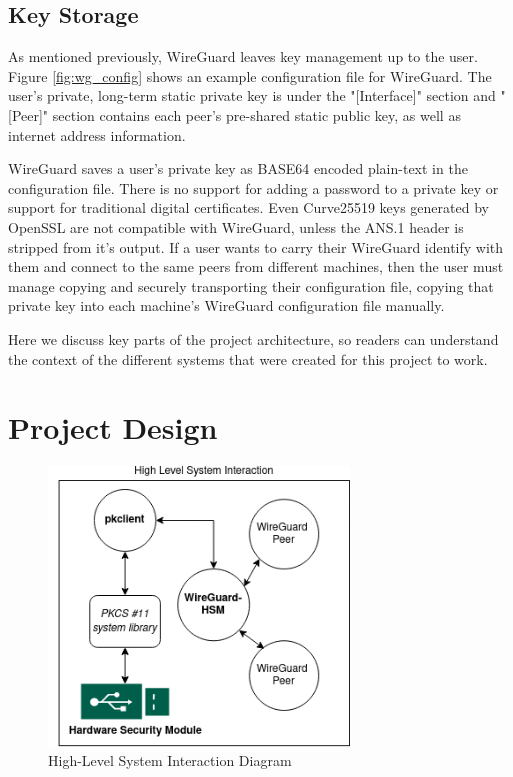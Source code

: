 \documentclass [11pt, proquest] {uwthesis}[2020/02/24]
\begin{document}
\subsection{Key Storage}
As mentioned previously, WireGuard leaves key management up to the user.
Figure \ref{fig:wg_config} shows an example configuration file for WireGuard. The user's private, long-term static private key is under the "[Interface]" section and "[Peer]" section contains each peer's pre-shared static public key, as well as internet address information.

WireGuard saves a user's private key as BASE64 encoded plain-text in the configuration file. There is no support for adding a password to a private key or support for traditional digital certificates. Even Curve25519 keys generated by OpenSSL are not compatible with WireGuard, unless the ANS.1 header is stripped from it's output.
If a user wants to carry their WireGuard identify with them and connect to the same peers from different machines, then the user must manage copying and securely transporting their configuration file, copying that private key into each machine's WireGuard configuration file manually. 


Here we discuss key parts of the project architecture, so readers can understand the context of the different systems that were created for this project to work.
\section{Project Design}

\begin{figure}[ht]
\begin{center}
\includegraphics[width=8cm]{paper/images/high-level-overview.png}
\caption{High-Level System Interaction Diagram}
\label{fig:highlevel_system}
\end{center}
\end{figure}
\end{document}

